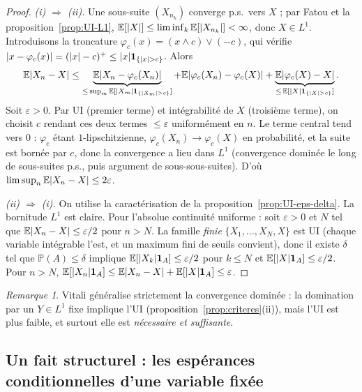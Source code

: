 \documentclass[11pt,a4paper]{article}
\theoremstyle{plain}
\theoremstyle{definition}
\theoremstyle{remark}
\newtheorem{remark}[theorem]{Remarque}
\newcommand{\E}{\mathbb{E}}
\newcommand{\Prob}{\mathbb{P}}
\newcommand{\ind}{\mathbf{1}}
\DeclarePairedDelimiter{\abs}{\lvert}{\rvert}
\begin{document}
\begin{proof}
\emph{(i) $\Rightarrow$ (ii).} Une sous-suite $(X_{n_k})$ converge p.s.\ vers
$X$ ; par Fatou et la proposition~\ref{prop:UI-L1},
$\E[\abs{X}] \le \liminf_k \E[\abs{X_{n_k}}] < \infty$, donc $X \in L^1$.
Introduisons la troncature $\varphi_c(x) = (x \wedge c) \vee (-c)$, qui vérifie
$\abs{x - \varphi_c(x)} = (\abs{x} - c)^+ \le \abs{x}\ind_{\{\abs{x}>c\}}$.
Alors
\[
\E\abs{X_n - X}
\le \underbrace{\E\abs{X_n - \varphi_c(X_n)}}_{\le\, \sup_m \E[\abs{X_m}\ind_{\{\abs{X_m}>c\}}]}
+ \E\abs{\varphi_c(X_n) - \varphi_c(X)}
+ \underbrace{\E\abs{\varphi_c(X) - X}}_{\le\, \E[\abs{X}\ind_{\{\abs{X}>c\}}]}.
\]
Soit $\varepsilon > 0$. Par UI (premier terme) et intégrabilité de $X$
(troisième terme), on choisit $c$ rendant ces deux termes $\le \varepsilon$
uniformément en $n$. Le terme central tend vers $0$ : $\varphi_c$ étant
$1$-lipschitzienne, $\varphi_c(X_n) \to \varphi_c(X)$ en probabilité, et la
suite est bornée par $c$, donc la convergence a lieu dans $L^1$ (convergence
dominée le long de sous-suites p.s., puis argument de sous-sous-suites).
D'où $\limsup_n \E\abs{X_n - X} \le 2\varepsilon$.

\emph{(ii) $\Rightarrow$ (i).} On utilise la caractérisation de la
proposition~\ref{prop:UI-eps-delta}. La bornitude $L^1$ est claire. Pour
l'absolue continuité uniforme : soit $\varepsilon > 0$ et $N$ tel que
$\E\abs{X_n - X} \le \varepsilon/2$ pour $n > N$. La famille \emph{finie}
$\{X_1, \dots, X_N, X\}$ est UI (chaque variable intégrable l'est, et un
maximum fini de seuils convient), donc il existe $\delta$ tel que
$\Prob(A) \le \delta$ implique $\E[\abs{X_k}\ind_A] \le \varepsilon/2$ pour
$k \le N$ et $\E[\abs{X}\ind_A] \le \varepsilon/2$. Pour $n > N$,
$\E[\abs{X_n}\ind_A] \le \E\abs{X_n - X} + \E[\abs{X}\ind_A] \le \varepsilon$.
\end{proof}

\begin{remark}
Vitali généralise strictement la convergence dominée : la domination par un
$Y \in L^1$ fixe implique l'UI (proposition~\ref{prop:criteres}(ii)), mais l'UI
est plus faible, et surtout elle est \emph{nécessaire et suffisante}.
\end{remark}

\subsection{Un fait structurel : les espérances conditionnelles d'une
variable fixée}
\end{document}
